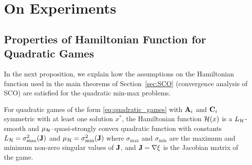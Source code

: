 \documentclass{article}
\begin{document}
\section{On Experiments}
\label{Appendix_Experiments}

\subsection{Properties of Hamiltonian Function for Quadratic Games}
\label{app:quadratic_game_proof}
In the next proposition, we explain how the assumptions on the Hamiltonian function used in the main theorems of Section~\ref{sec:SCO} (convergence analysis of SCO) are satisfied for the quadratic min-max problems.
\begin{proposition}
  For quadratic games of the form \eqref{eq:quadratic_games} with $\mathbf{A}_i$ and $\mathbf{C}_i$ symmetric with at least one solution $x^*$, the Hamiltonian function ${\cal H}(x)$ is a $L_{{\cal H}}$-smooth and $\mu_{{\cal H}}$–quasi-strongly convex quadratic function with constants $L_{{\cal H}} = \sigma^2_{\max}(\mathbf{J})$ and $\mu_{{\cal H}} = \sigma^2_{\min}(\mathbf{J})$ where
  $\sigma_{\max}$ and $\sigma_{\min}$ are the maximum and minimum non-zero singular values of $\mathbf{J}$, and $\mathbf{J}=\nabla \xi$ is the Jacobian matrix of the game.
\end{proposition} 
\end{document}
